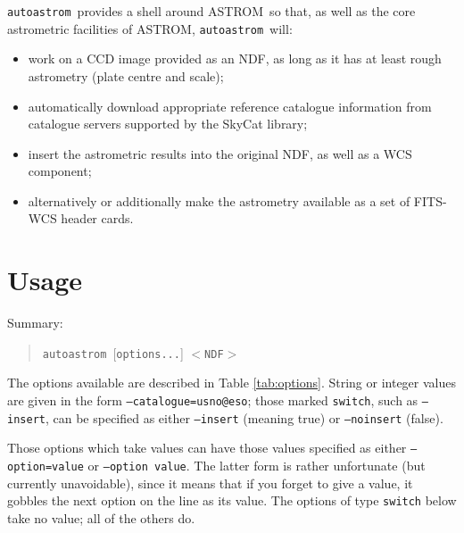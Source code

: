 \documentclass[twoside,11pt]{article}
\newcommand{\xlabel}[1]{}
\newcommand{\ASTROM}{{\footnotesize ASTROM}\normalsize}
\newcommand{\autoastrom}{\texttt{autoastrom}}
\begin{document}
\autoastrom\ provides a shell around \ASTROM\ so that, as well
as the core astrometric facilities of \ASTROM, \autoastrom\
will:

\begin{itemize}

\item work on a CCD image provided as an NDF, as long as it has at
least rough astrometry (plate centre and scale);

\item automatically download appropriate reference catalogue information
from catalogue servers supported by the SkyCat library;

\item insert the astrometric results into the original NDF, as well as
a WCS component; \item alternatively or additionally make the
astrometry available as a set of FITS-WCS header cards.  \end{itemize}

\section{\xlabel{se_usage}Usage\label{se:usage}}

Summary:
\begin{quote}
\autoastrom\ [\texttt{options...}] $<$\texttt{NDF}$>$
\end{quote}

The options available are described in Table \ref{tab:options}. String or
integer values are given in the form \texttt{--catalogue=usno@eso}; those
marked \texttt{switch}, such as \texttt{--insert}, can be specified as either
\texttt{--insert} (meaning true) or \texttt{--noinsert} (false).

Those options which take values can have those values specified as either
\texttt{--option=value} or \texttt{--option value}. The latter form is rather
unfortunate (but currently unavoidable), since it means that if you forget to
give a value, it gobbles the next option on the line as its value. The options
of type \texttt{switch} below take no value; all of the others do.
\end{document}
